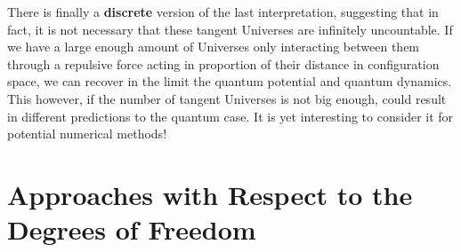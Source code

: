 \documentclass[11pt, a4paper]{article} %
\begin{document}
There is finally a {\bf discrete} version of the last interpretation, suggesting that in fact, it is not necessary that these tangent Universes are infinitely uncountable. If we have a large enough amount of Universes only interacting between them through a repulsive force acting in proportion of their distance in configuration space, we can recover in the limit the quantum potential and quantum dynamics. This however, if the number of tangent Universes is not big enough, could result in different predictions to the quantum case. It is yet interesting to consider it for potential numerical methods!\vspace{-0.3cm}


\section*{Approaches with Respect to the Degrees of Freedom}
\vspace{-0.2cm}
\end{document}
